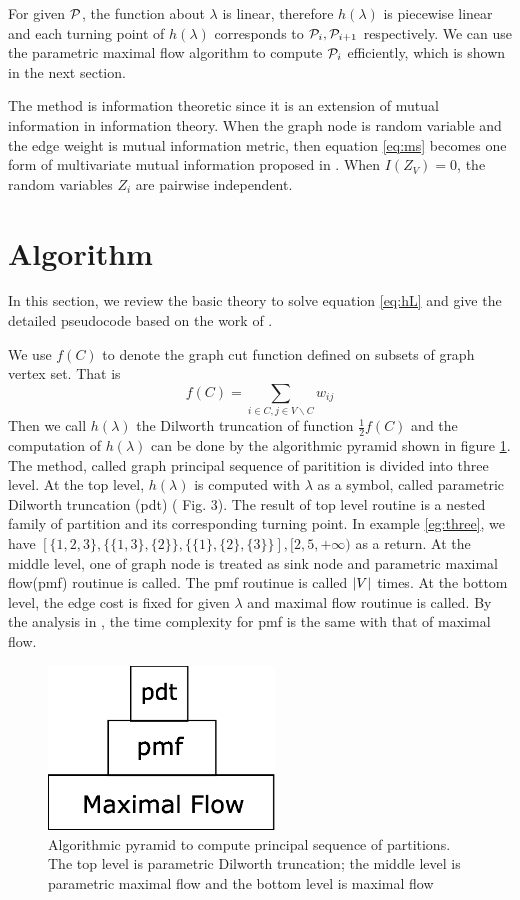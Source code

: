 \documentclass{article}
\begin{document}
For given $\P$, the function about $\lambda$ is linear, therefore $h(\lambda)$ is piecewise linear and each turning point of $h(\lambda)$ corresponds to $\P_i, \P_{i+1}$ respectively. We can use the parametric maximal flow algorithm to compute $\P_i$ efficiently, which is shown in the next section.

The method is information theoretic since it is an extension of mutual information in information theory. When the graph node is random variable and the edge weight is mutual information metric, then equation \eqref{eq:ms} becomes one form of multivariate mutual information proposed in \cite{RN1}. When $I(Z_V)=0$, the random variables $Z_i$ are pairwise independent. 

\section{Algorithm}\label{sec:algorithm}

In this section, we review the basic theory to solve equation \eqref{eq:hL} and give the detailed pseudocode based on the work of \cite{RN4}.

We use $f(C)$ to denote the graph cut function defined on subsets of graph vertex set. That is
\begin{equation}
f(C) =\sum_{ i\in C, j\in V\backslash C} w_{ij}
\end{equation}
Then we call $h(\lambda)$ the Dilworth truncation of function $ \frac{1}{2} f(C)$ and the computation of $h(\lambda)$ can be done by the algorithmic pyramid shown in figure \ref{fig:pyramid}. The method, called graph principal sequence of paritition is divided into three level. At the top level, $h(\lambda)$ is computed with $\lambda$ as a symbol, called parametric Dilworth truncation (pdt) (\cite{RN4} Fig. 3). The result of top level routine is a nested family of partition and its corresponding turning point. In example \ref{eg:three}, we have $[\{1,2,3\},\{\{1,3\},\{2\}\},\{\{1\},\{2\},\{3\}\}],[2,5,+\infty) $ as a return. At the middle level, one of graph node is treated as sink node and parametric maximal flow(pmf) routinue is called.
The pmf routinue is called $\abs{V}$ times. At the bottom level, the edge cost is fixed for given $\lambda$ and maximal flow routinue is called. By the analysis in \cite{RN17}, the time complexity for pmf is the same with that of maximal flow.
\begin{figure}
\centering
\includegraphics[width=6cm]{pdt.eps}
\caption{Algorithmic pyramid to compute principal sequence of partitions. The top level is parametric Dilworth truncation; the middle level is parametric maximal flow and the bottom level is maximal flow}\label{fig:pyramid}
\end{figure}
\end{document}
